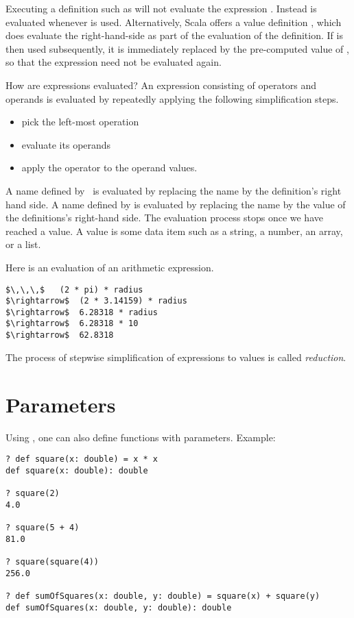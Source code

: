 \documentclass[a4paper,12pt,twoside,titlepage]{book}
\begin{document}
Executing a definition such as  will not evaluate the
expression .  Instead  is evaluated whenever 
is used. Alternatively, Scala offers a value definition 
, which does evaluate the right-hand-side  as part of the
evaluation of the definition. If  is then used subsequently,
it is immediately replaced by the pre-computed value of
, so that the expression need not be evaluated again.
 
How are expressions evaluated? An expression consisting of operators
and operands is evaluated by repeatedly applying the following
simplification steps.
\begin{itemize}
\item pick the left-most operation
\item evaluate its operands
\item apply the operator to the operand values.
\end{itemize}
A name defined by \ is evaluated by replacing the name by the
definition's right hand side. A name defined by  is
evaluated by replacing the name by the value of the definitions's
right-hand side.  The evaluation process stops once we have reached a
value. A value is some data item such as a string, a number, an array,
or a list.

\example
Here is an evaluation of an arithmetic expression.
\begin{lstlisting}
$\,\,\,$   (2 * pi) * radius
$\rightarrow$  (2 * 3.14159) * radius
$\rightarrow$  6.28318 * radius
$\rightarrow$  6.28318 * 10
$\rightarrow$  62.8318
\end{lstlisting}
The process of stepwise simplification of expressions to values is
called {\em reduction}.

\section{Parameters}

Using , one can also define functions with parameters. Example:
\begin{lstlisting}
? def square(x: double) = x * x
def square(x: double): double

? square(2)
4.0

? square(5 + 4)
81.0

? square(square(4))
256.0

? def sumOfSquares(x: double, y: double) = square(x) + square(y)
def sumOfSquares(x: double, y: double): double
\end{lstlisting}
\end{document}
